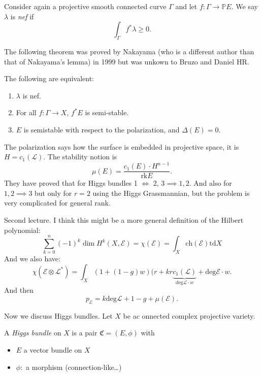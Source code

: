 \documentclass{book}
\begin{document}
\noindent
\begin{definition}
\label{definition-nef}
Consider again a projective smooth connected
curve $\Gamma$ and let $f:\Gamma \to
\mathbb{P}E$.
We say $\lambda$ is {\it nef} if
$$
\int_{\Gamma} f^*\lambda\geq 0.
$$
\end{definition}


\noindent
The following theorem was proved by Nakayama
(who is a different author than that of
Nakayama's lemma)
in 1999 but was unkown to Bruzo and Daniel
HR.
\begin{theorem}
\label{theorem-bruzzo-daniel-nakayama}
The following are equivalent:
\begin{enumerate}
\item $\lambda$ is nef.
\item For all $f:\Gamma \to X$,
$f^*E$ is semi-stable.
\item $E$ is semistable with respect to
the polarization, and  $\Delta(E)=0$.
\end{enumerate}
\end{theorem}

The polarization says how the surface is
embedded in projective space,
it is $H=c_1(\mathcal{L})$. The stability
notion is
$$
\mu(E)=\frac{c_1(E)\cdot
H^{n-1}}{\text{rk}E}.
$$
\medskip\noindent
They have proved that for Higgs bundles 1
$\iff$ 2, $3 \implies 1,2$.
And also for $1,2 \implies 3$ but only for
$r=2$ using the Higgs Grassmannian,
but the problem is very complicated for
general rank.

\medskip\noindent
Second lecture. I think this might be a more
general
definition of the Hilbert polynomial:
$$
\sum_{k=0}^n(-1)^k \dim
H^k(X,\mathcal{E})=\chi(\mathcal{E})
=\int_X\text{ch}(\mathcal{E})\text{td}X
$$
And we also have:
$$
\chi(\mathcal{E}\otimes \mathcal{L}^*)
=\int_X (1+(1-g)w)(r+kr
\underbrace{c_1(\mathcal{L})}_{\text{deg}
\mathcal{L}\cdot
w}
+\text{deg}\mathcal{E}\cdot w.
$$
And then
$$
p_{\mathcal{E}}=k \text{deg} \mathcal{L}
+1-g+\mu(\mathcal{E}).
$$



\medskip\noindent
Now we discuss Higgs bundles.
Let $X$ be ac onnected complex projective
variety.

\begin{definition}
\label{definition-higgs-bundle}
A {\it Higgs bundle} on $X$
is a pair $\mathfrak{C}=(E,\phi)$ with
\begin{itemize}
\item $E$ a vector bundle on $X$
\item $\phi:$ a morphism (connection-like…)
\end{itemize}
\end{definition}
\end{document}

